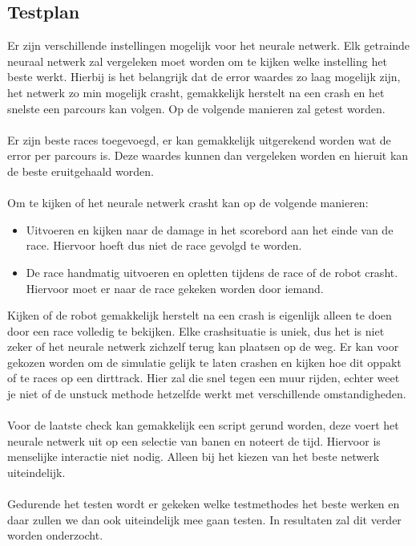 \subsection{Testplan}

Er zijn verschillende instellingen mogelijk voor het neurale netwerk. Elk getrainde neuraal netwerk zal vergeleken moet worden om te kijken welke instelling het beste werkt. Hierbij is het belangrijk dat de error waardes zo laag mogelijk zijn, het netwerk zo min mogelijk crasht, gemakkelijk herstelt na een crash en het snelste een parcours kan volgen. Op de volgende manieren zal getest worden. \\\\
Er zijn beste races toegevoegd, er kan gemakkelijk uitgerekend worden wat de error per parcours is. Deze waardes kunnen dan vergeleken worden en hieruit kan de beste eruitgehaald worden. \\\\
Om te kijken of het neurale netwerk crasht kan op de volgende manieren: 
\begin{itemize}
\item Uitvoeren en kijken naar de damage in het scorebord aan het einde van de race. Hiervoor hoeft dus niet de race gevolgd te worden.
\item De race handmatig uitvoeren en opletten tijdens de race of de robot crasht. Hiervoor moet er naar de race gekeken worden door iemand.
\end{itemize}

\noindent Kijken of de robot gemakkelijk herstelt na een crash is eigenlijk alleen te doen door een race volledig te bekijken. Elke crashsituatie is uniek, dus het is niet zeker of het neurale netwerk zichzelf terug kan plaatsen op de weg. Er kan voor gekozen worden om de simulatie gelijk te laten crashen en kijken hoe dit oppakt of te races op een dirttrack. Hier zal die snel tegen een muur rijden, echter weet je niet of de unstuck methode hetzelfde werkt met verschillende omstandigheden. \\\\
Voor de laatste check kan gemakkelijk een script gerund worden, deze voert het neurale netwerk uit op een selectie van banen en noteert de tijd. Hiervoor is menselijke interactie niet nodig. Alleen bij het kiezen van het beste netwerk uiteindelijk. \\\\

Gedurende het testen wordt er gekeken welke testmethodes het beste werken en daar zullen we dan ook uiteindelijk mee gaan testen. In resultaten zal dit verder worden onderzocht. 
